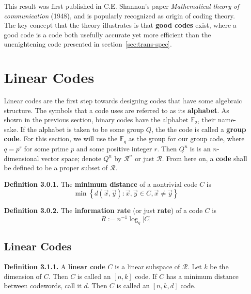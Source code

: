 \documentclass{article}
\newcommand{\F}{\mathbb{F}}
\newcommand{\calR}{\mathcal{R}}
\renewcommand{\=}{\equiv}
\renewcommand{\i}{^{-1}}
\newcommand{\set}[1]{\left\{ #1 \right\}}
\renewcommand{\v}{\vec}
\newcommand{\x}{{\v x}}
\newcommand{\y}{{\v y}}
\newcommand{\definition}[1]{\vspace{1em}\noindent\textbf{Definition #1.} }
\begin{document}
This result was first published in C.E. Shannon's paper \textit{Mathematical theory of communication} (1948), and is popularly recognized as origin of coding theory.
The key concept that the theory illustrates is that \textbf{good codes} exist, where a good code is a code both usefully accurate yet more efficient than the unenightening code presented in section~\ref{sec:trans-spec}.


\section{Linear Codes}

Linear codes are the first step towards designing codes that have some algebraic structure.
The symbols that a code uses are referred to as its \textbf{alphabet}. As shown in the previous section, binary codes have the alphabet $\F_2$, their name-sake.
If the alphabet is taken to be some group $Q$, the the code is called a \textbf{group code}.
For this section, we will use the $\F_q$ as the group for our group code, where $q = p^r$ for some prime $p$ and some positive integer $r$.
Then $Q^n$ is is an $n$-dimensional vector space; denote $Q^n$ by $\calR^n$ or just $\calR$.
From here on, a \textbf{code} shall be defined to be a proper subset of $\calR$.

\definition{3.0.1}
The \textbf{minimum distance} of a nontrivial code $C$ is
$$ \min\set{ d(\x, \y) : \x,\y \in C, \x \neq \y } $$

\definition{3.0.2}
The \textbf{information rate} (or just \textbf{rate}) of a code $C$ is
$$ R := n\i \log_q |C| $$

\subsection{Linear Codes}

\definition{3.1.1}
A \textbf{linear code} $C$ is a linear subspace of $\calR$.
Let $k$ be the dimension of $C$.
Then $C$ is called an $[n,k]$ code.
If $C$ has a minimum distance between codewords, call it $d$.
Then $C$ is called an $[n,k,d]$ code.
\end{document}
